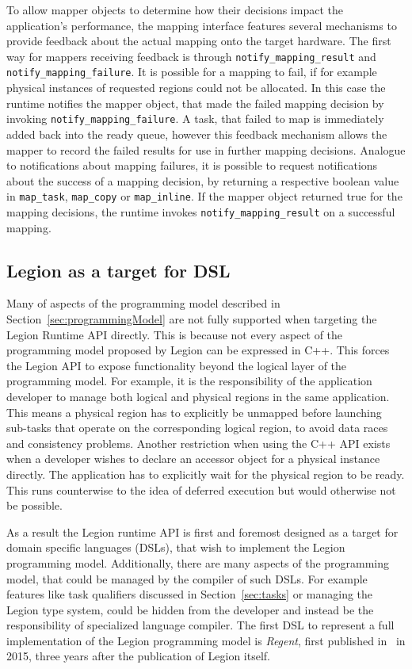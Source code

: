 \documentclass{article}      %
\begin{document}
To allow mapper objects to determine how their decisions impact the application's performance, the mapping interface features several mechanisms to provide feedback about the actual mapping onto the target hardware. The first way for mappers receiving feedback is through \lstinline{notify_mapping_result} and \lstinline{notify_mapping_failure}. It is possible for a mapping to fail, if for example physical instances of requested regions could not be allocated. In this case the runtime notifies the mapper object, that made the failed mapping decision by invoking \lstinline{notify_mapping_failure}. A task, that failed to map is immediately added back into the ready queue, however this feedback mechanism allows the mapper to record the failed results for use in further mapping decisions. Analogue to notifications about mapping failures, it is possible to request notifications about the success of a mapping decision, by returning a respective boolean value in \lstinline{map_task}, \lstinline{map_copy} or \lstinline{map_inline}. If the mapper object returned true for the mapping decisions, the runtime invokes \lstinline{notify_mapping_result} on a successful mapping.

\subsection{Legion as a target for DSL}
Many of aspects of the programming model described in Section~\ref{sec:programmingModel} are not fully supported when targeting the Legion Runtime API directly. This is because not every aspect of the programming model proposed by Legion can be expressed in C++. This forces the Legion API to expose functionality beyond the logical layer of the programming model. For example, it is the responsibility of the application developer to manage both logical and physical regions in the same application. This means a physical region has to explicitly be unmapped before launching sub-tasks that operate on the corresponding logical region, to avoid data races and consistency problems. Another restriction when using the C++ API exists when a developer wishes to declare an accessor object for a physical instance directly. The application has to explicitly wait for the physical region to be ready. This runs counterwise to the idea of deferred execution but would otherwise not be possible.

As a result the Legion runtime API is first and foremost designed as a target for domain specific languages (DSLs), that wish to implement the Legion programming model. Additionally, there are many aspects of the programming model, that could be managed by the compiler of such DSLs. For example features like task qualifiers discussed in Section~\ref{sec:tasks} or managing the Legion type system, could be hidden from the developer and instead be the responsibility of specialized language compiler. The first DSL to represent a full implementation of the Legion programming model is \emph{Regent}, first published in~\cite{regentPaper} in 2015, three years after the publication of Legion itself.
\end{document}
